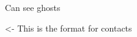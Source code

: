 \documentclass[char]{Silversiders}
\begin{document}
\name{\cOracle{}}

Can see ghosts

\begin{itemz}[Goals]
	\item 
\end{itemz}

\begin{itemz}[Notes]
	\item 
\end{itemz}

\begin{contacts}
	\contact{\cTest{}} <- This is the format for contacts 
\end{contacts}
\end{document}
